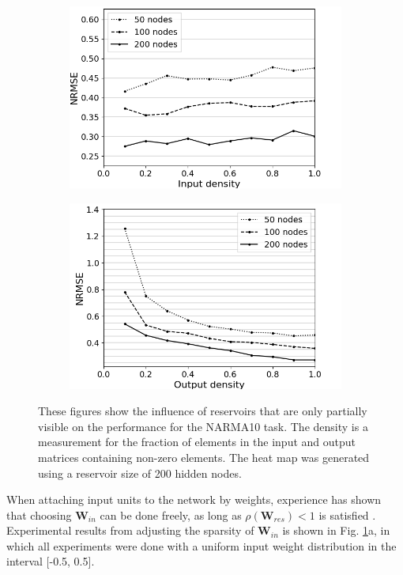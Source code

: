 \begin{figure}[htbp]
  \centering
  \begin{subfigure}{.49\textwidth}
    \centering
    \includegraphics[width=0.8\linewidth]{img/input_density_all.png}
    \caption{}
  \end{subfigure}
  \begin{subfigure}{.49\textwidth}
    \centering
    \includegraphics[width=0.8\linewidth]{img/output_density_all.png}
    \caption{}
  \end{subfigure}
  \caption{
    These figures show the influence of reservoirs that are only partially
visible on the performance for the NARMA10 task. The density is a measurement
for the fraction of elements in the input and output matrices containing
non-zero elements. The heat map was generated using a reservoir size of 200
hidden nodes.
  }
  \label{partial_visibility}
\end{figure}

When attaching input units to the network by weights, experience has shown that
choosing $\mathbf{W}_{in}$ can be done freely, as long as
$\rho(\mathbf{W}_{res}) < 1$ is satisfied \cite{jaeger_echo_2001}. Experimental
results from adjusting the sparsity of $\mathbf{W}_{in}$ is shown in
Fig. \ref{partial_visibility}a, in which all experiments were done with a
uniform input weight distribution in the interval [-0.5, 0.5].

